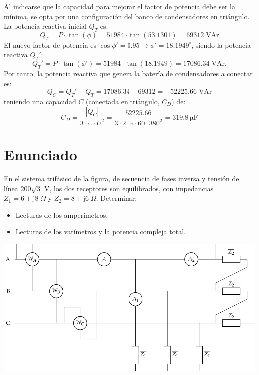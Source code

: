 Al indicarse que la capacidad para mejorar el factor de potencia debe ser la {mínima}, se opta por una configuración del banco de condensadores en {triángulo}. La potencia reactiva inicial $Q_T$ es:
\begin{equation*}
    Q_T=P\cdot \tan(\phi)=51984\cdot \tan(53.1301)=69312\;\text{VAr}
\end{equation*}
El nuevo factor de potencia es $\cos{\phi'}=0.95\rightarrow\phi'=18.1949^\circ$, siendo la potencia reactiva $Q_T'$:
\begin{equation*}
    Q_T'=P\cdot \tan(\phi')=51984\cdot \tan(18.1949)=17086.34\;\text{VAr}.
\end{equation*}
Por tanto, la potencia reactiva que genera la batería de condensadores a conectar es: 
\begin{equation*}
    Q_C=Q_T'-Q_T=17086.34-69312=-52225.66\;\text{VAr}
\end{equation*}
teniendo una capacidad $C$ (conectada en triángulo, $C_D$) de:
\begin{equation*}
    C_D=\dfrac{|Q_C|}{3\cdot\omega\cdot U^2}=\dfrac{52225.66}{3\cdot 2\cdot\pi\cdot 60\cdot 380^2}= \qty{319.8}{\micro\farad}
\end{equation*}




\section{Enunciado}
 
En el sistema trifásico de la figura, de secuencia de fases inversa y tensión de línea 200$\sqrt{3}$ V, los dos receptores son equilibrados, con impedancias $\overline{Z_1} = 6+\mathrm{j}8\;\Omega$ y $\overline{Z_2} = 8+\mathrm{j}6\;\Omega$. Determinar:
\begin{itemize}
    \item  Lecturas de los amperímetros.
    \item  Lecturas de los vatímetros y la potencia compleja total.
\end{itemize}
\begin{center}
  \includegraphics[width=.8\linewidth]{figuras/ej5_BT3.pdf}
\end{center}

